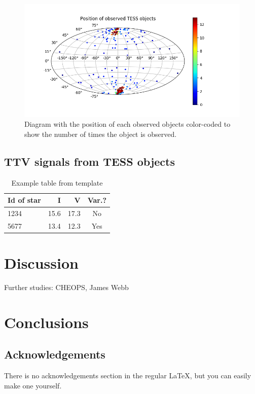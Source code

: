 \documentclass[12pt]{report}
\begin{document}
	\begin{figure}
		\centering
		\includegraphics[width=12cm]{img/skymap_TESS_wrap.png}
	  	\caption{Diagram with the position of each observed objects color-coded to show the number of times the object is observed.}	
	  	\label{fig:skymap_TESS}	
	  \end{figure}

\section{TTV signals from TESS objects}


\begin{table}[!h]
\caption{Example table from template}\smallskip
\label{table:1}
\centering  
\begin{tabular}{lrrc}
\hline\hline  
\smallskip
Id of star & I &  V & Var.? \\
\hline
1234 & 15.6 & 17.3 & No \\
5677 & 13.4 & 12.3 & Yes\\
\hline
\end{tabular}
\end{table}

\chapter{Discussion}
	Further studies: CHEOPS, James Webb
\chapter{Conclusions}


\section*{Acknowledgements}

There is no acknowledgements section in the regular LaTeX, but you can easily
make one yourself.
\end{document}
